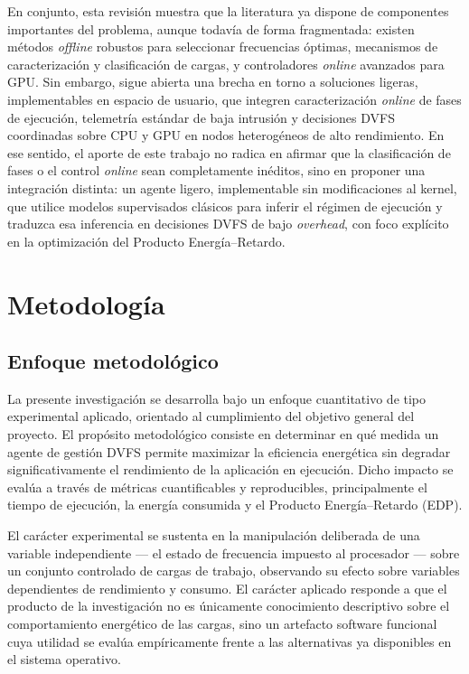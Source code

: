 \documentclass[12pt,oneside,spanish]{book}
\begin{document}
En conjunto, esta revisión muestra que la literatura ya dispone de componentes importantes del problema, aunque todavía de forma fragmentada: existen métodos \textit{offline} robustos para seleccionar frecuencias óptimas, mecanismos de caracterización y clasificación de cargas, y controladores \textit{online} avanzados para GPU. Sin embargo, sigue abierta una brecha en torno a soluciones ligeras, implementables en espacio de usuario, que integren caracterización \textit{online} de fases de ejecución, telemetría estándar de baja intrusión y decisiones DVFS coordinadas sobre CPU y GPU en nodos heterogéneos de alto rendimiento. En ese sentido, el aporte de este trabajo no radica en afirmar que la clasificación de fases o el control \textit{online} sean completamente inéditos, sino en proponer una integración distinta: un agente ligero, implementable sin modificaciones al kernel, que utilice modelos supervisados clásicos para inferir el régimen de ejecución y traduzca esa inferencia en decisiones DVFS de bajo \textit{overhead}, con foco explícito en la optimización del Producto Energía--Retardo.


\chapter{Metodología}

\section{Enfoque metodológico}

La presente investigación se desarrolla bajo un enfoque cuantitativo de tipo experimental aplicado, orientado al cumplimiento del objetivo general del proyecto. El propósito metodológico consiste en determinar en qué medida un agente de gestión DVFS permite maximizar la eficiencia energética sin degradar significativamente el rendimiento de la aplicación en ejecución. Dicho impacto se evalúa a través de métricas cuantificables y reproducibles, principalmente el tiempo de ejecución, la energía consumida y el Producto Energía--Retardo (EDP).

El carácter experimental se sustenta en la manipulación deliberada de una variable independiente --- el estado de frecuencia impuesto al procesador --- sobre un conjunto controlado de cargas de trabajo, observando su efecto sobre variables dependientes de rendimiento y consumo. El carácter aplicado responde a que el producto de la investigación no es únicamente conocimiento descriptivo sobre el comportamiento energético de las cargas, sino un artefacto software funcional cuya utilidad se evalúa empíricamente frente a las alternativas ya disponibles en el sistema operativo.
\end{document}
